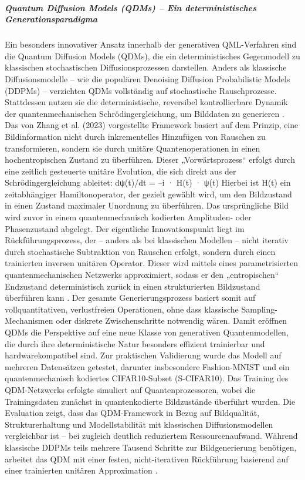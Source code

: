 \subparagraph{Quantum Diffusion Models (QDMs) – Ein deterministisches Generationsparadigma}
Ein besonders innovativer Ansatz innerhalb der generativen QML-Verfahren sind die Quantum Diffusion Models (QDMs), die ein deterministisches Gegenmodell zu klassischen stochastischen Diffusionsprozessen darstellen. Anders als klassische Diffusionsmodelle – wie die populären Denoising Diffusion Probabilistic Models (DDPMs) – verzichten QDMs vollständig auf stochastische Rauschprozesse. Stattdessen nutzen sie die deterministische, reversibel kontrollierbare Dynamik der quantenmechanischen Schrödingergleichung, um Bilddaten zu generieren \cite{zhangGenerativeQuantumMachine2024}.
Das von Zhang et al. (2023) vorgestellte Framework basiert auf dem Prinzip, eine Bildinformation nicht durch inkrementelles Hinzufügen von Rauschen zu transformieren, sondern sie durch unitäre Quantenoperationen in einen hochentropischen Zustand zu überführen. Dieser „Vorwärtsprozess“ erfolgt durch eine zeitlich gesteuerte unitäre Evolution, die sich direkt aus der Schrödingergleichung ableitet:
dψ(t)/dt = –i · H(t) · ψ(t) 
Hierbei ist H(t) ein zeitabhängiger Hamiltonoperator, der gezielt gewählt wird, um den Bildzustand in einen Zustand maximaler Unordnung zu überführen. Das ursprüngliche Bild wird zuvor in einem quantenmechanisch kodierten Amplituden- oder Phasenzustand abgelegt.
Der eigentliche Innovationspunkt liegt im Rückführungsprozess, der – anders als bei klassischen Modellen – nicht iterativ durch stochastische Subtraktion von Rauschen erfolgt, sondern durch einen trainierten inversen unitären Operator. Dieser wird mittels eines parametrisierten quantenmechanischen Netzwerks approximiert, sodass er den „entropischen“ Endzustand deterministisch zurück in einen strukturierten Bildzustand überführen kann \cite{zhangGenerativeQuantumMachine2024}.
Der gesamte Generierungsprozess basiert somit auf vollquantitativen, verlustfreien Operationen, ohne dass klassische Sampling-Mechanismen oder diskrete Zwischenschritte notwendig wären. Damit eröffnen QDMs die Perspektive auf eine neue Klasse von generativen Quantenmodellen, die durch ihre deterministische Natur besonders effizient trainierbar und hardwarekompatibel sind.
Zur praktischen Validierung wurde das Modell auf mehreren Datensätzen getestet, darunter insbesondere Fashion-MNIST und ein quantenmechanisch kodiertes CIFAR10-Subset (S-CIFAR10). Das Training des QDM-Netzwerks erfolgte simuliert auf Quantenprozessoren, wobei die Trainingsdaten zunächst in quantenkodierte Bildzustände überführt wurden.
Die Evaluation zeigt, dass das QDM-Framework in Bezug auf Bildqualität, Strukturerhaltung und Modellstabilität mit klassischen Diffusionsmodellen vergleichbar ist – bei zugleich deutlich reduziertem Ressourcenaufwand. Während klassische DDPMs teils mehrere Tausend Schritte zur Bildgenerierung benötigen, arbeitet das QDM mit einer festen, nicht-iterativen Rückführung basierend auf einer trainierten unitären Approximation \cite{zhangGenerativeQuantumMachine2024}.
